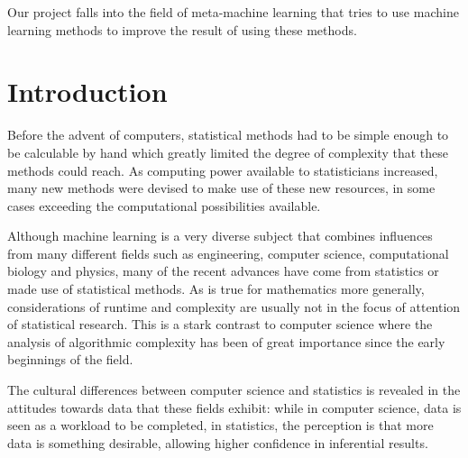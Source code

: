 \documentclass[a4paper,12pt,twoside,openright]{report}
\begin{document}
\pagestyle{empty}
\singlespacing

\onehalfspacing

\singlespacing


Our project falls into the field of meta-machine learning that tries to use machine learning methods to improve the result of using these methods.

\setcounter{page}{0}
\pagestyle{plain}
\tableofcontents
\listoffigures
\listoftables 
\listoftodos %

\onehalfspacing


\chapter{Introduction}

\setcounter{page}{1}

Before the advent of computers, statistical methods had to be simple enough to be calculable by hand which greatly limited the degree of complexity that these methods could reach. As computing power available to statisticians increased, many new methods were devised to make use of these new resources, in some cases exceeding the computational possibilities available. %

Although machine learning is a very diverse subject that combines influences from many different fields such as engineering, computer science, computational biology and physics, many of the recent advances have come from statistics or made use of statistical methods. As is true for mathematics more generally, considerations of runtime and complexity are usually not in the focus of attention of statistical research. This is a stark contrast to computer science where the analysis of algorithmic complexity has been of great importance since the early beginnings of the field.

The cultural differences between computer science and statistics is revealed in the attitudes towards data that these fields exhibit: while in computer science, data is seen as a workload to be completed, in statistics, the perception is that more data is something desirable, allowing higher confidence in inferential results.
\end{document}
